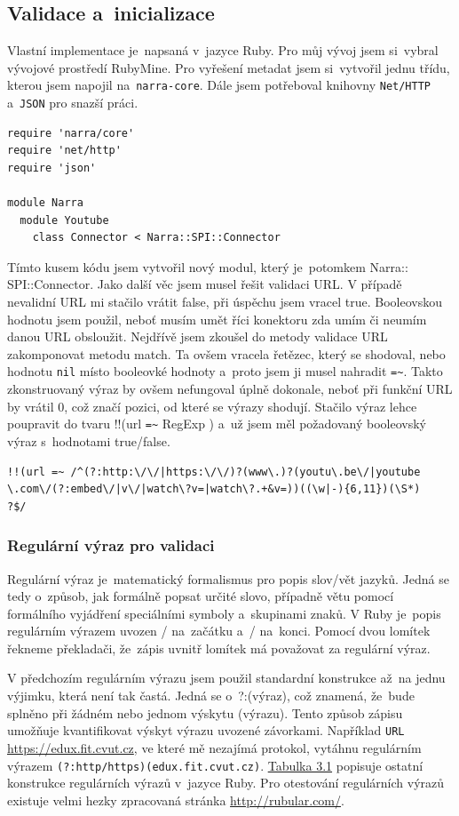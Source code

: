 \subsection{Validace a~inicializace}
\par Vlastní implementace je~napsaná v~jazyce Ruby. Pro můj vývoj jsem si~vybral vývojové prostředí RubyMine. Pro vyřešení metadat jsem si~vytvořil jednu třídu, kterou jsem napojil na~\texttt{narra-core}. Dále jsem potřeboval knihovny \texttt{Net/HTTP} a~\texttt{JSON} pro snazší práci.
\begin{verbatim}
require 'narra/core'
require 'net/http'
require 'json'

module Narra
  module Youtube
    class Connector < Narra::SPI::Connector
\end{verbatim}
\par Tímto kusem kódu jsem vytvořil nový modul, který je~potomkem Narra::\\SPI::Connector. Jako další věc jsem musel řešit validaci URL. V případě nevalidní URL mi stačilo vrátit false, při úspěchu jsem vracel true. Booleovskou hodnotu jsem použil, neboť musím umět říci konektoru zda umím či neumím danou URL obsloužit. Nejdřívě jsem zkoušel do metody validace URL zakomponovat metodu match. Ta ovšem vracela řetězec, který se shodoval, nebo hodnotu \texttt{nil} místo booleovké hodnoty a~proto jsem ji musel nahradit \verb|=~|. Takto zkonstruovaný výraz by ovšem nefungoval úplně dokonale, neboť při funkční URL by vrátil 0, což značí pozici, od které se výrazy shodují. Stačilo výraz lehce poupravit do tvaru !!(url \verb|=~| RegExp ) a~už jsem měl požadovaný booleovský výraz s~hodnotami true/false.
\begin{verbatim}
!!(url =~ /^(?:http:\/\/|https:\/\/)?(www\.)?(youtu\.be\/|youtube
\.com\/(?:embed\/|v\/|watch\?v=|watch\?.+&v=))((\w|-){6,11})(\S*)
?$/
\end{verbatim}
\subsubsection{Regulární výraz pro validaci}
\par Regulární výraz\cite{regexp} je~matematický formalismus pro popis slov/vět jazyků. Jedná se tedy o~způsob, jak formálně popsat určité slovo, případně větu pomocí formálního vyjádření speciálními symboly a~skupinami znaků. V Ruby\cite{ruby} je~popis regulárním výrazem uvozen / na~začátku a~/ na~konci. Pomocí dvou lomítek řekneme překladači, že~zápis uvnitř lomítek má považovat za regulární výraz.
\par V předchozím regulárním výrazu jsem použil standardní konstrukce až~na jednu výjimku, která není tak častá. Jedná se o~?:(výraz), což znamená, že~bude splněno při žádném nebo jednom výskytu (výrazu). Tento způsob zápisu umožňuje kvantifikovat výskyt výrazu uvozené závorkami. Například \texttt{URL} \url{https://edux.fit.cvut.cz}, ve které mě nezajímá protokol, vytáhnu regulárním výrazem \texttt{(?:http/https)(edux.fit.cvut.cz)}. \hyperlink{regtable}{Tabulka 3.1} popisuje ostatní konstrukce regulárních výrazů v~jazyce Ruby. Pro otestování regulárních výrazů existuje velmi hezky zpracovaná stránka \url{http://rubular.com/}\cite{michaellovitt}.


